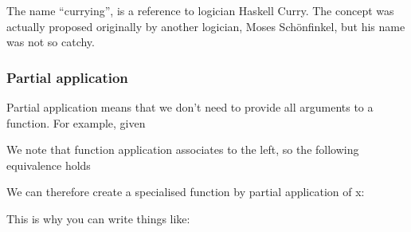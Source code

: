 The name ``currying'', is a reference to logician Haskell Curry. The
concept was actually proposed originally by another logician, Moses
Schönfinkel, but his name was not so catchy.

\subsubsection{Partial application}\label{partial-application}

Partial application means that we don't need to provide all arguments to
a function. For example, given

\begin{Shaded}
\begin{Highlighting}[]
    \FunctionTok{=} \FunctionTok{*}\FunctionTok{+}\FunctionTok{*}
\end{Highlighting}
\end{Shaded}

We note that function application associates to the left, so the
following equivalence holds

\begin{Shaded}
\begin{Highlighting}[]
    \FunctionTok{=} 
\end{Highlighting}
\end{Shaded}

We can therefore create a specialised function by partial application of
x:

\begin{Shaded}
\begin{Highlighting}[]
    \FunctionTok{=}  
     
\end{Highlighting}
\end{Shaded}

This is why you can write things like:

\begin{Shaded}
\begin{Highlighting}[]
    \FunctionTok{=} \FunctionTok{*}\NormalTok{) [}  \NormalTok{]}
\end{Highlighting}
\end{Shaded}

